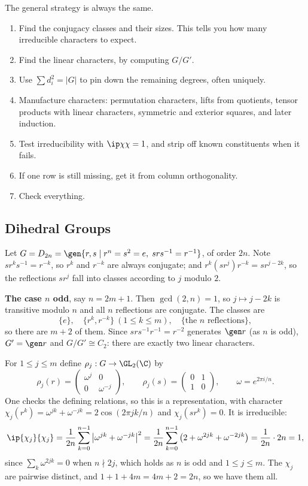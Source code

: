 The general strategy is always the same.
\begin{enumerate}[label=(\arabic*)]
	\item Find the conjugacy classes and their sizes. This tells you how many irreducible characters to expect.
	\item Find the linear characters, by computing $G/G'$.
	\item Use $\sum d_i^2 = |G|$ to pin down the remaining degrees, often uniquely.
	\item Manufacture characters: permutation characters, lifts from quotients, tensor products with linear characters, symmetric and exterior squares, and later induction.
	\item Test irreducibility with $\ip\chi\chi = 1$, and strip off known constituents when it fails.
	\item If one row is still missing, get it from column orthogonality.
	\item Check everything.
\end{enumerate}

\subsection{Dihedral Groups}

Let $G = D_{2n} = \gen{r,s \mid r^n = s^2 = e,\; srs^{-1} = r^{-1}}$, of order $2n$. Note $sr^ks^{-1} = r^{-k}$, so $r^k$ and $r^{-k}$ are always conjugate; and $r^k(sr^j)r^{-k} = sr^{j-2k}$, so the reflections $sr^j$ fall into classes according to $j$ modulo $2$.

\textbf{The case $n$ odd}, say $n = 2m+1$. Then $\gcd(2,n) = 1$, so $j \mapsto j - 2k$ is transitive modulo $n$ and all $n$ reflections are conjugate. The classes are
$$\{e\}, \quad \{r^k, r^{-k}\}\ (1\leq k\leq m), \quad \{\text{the } n \text{ reflections}\},$$
so there are $m + 2$ of them. Since $srs^{-1}r^{-1} = r^{-2}$ generates $\gen r$ (as $n$ is odd), $G' = \gen r$ and $G/G' \cong C_2$: there are exactly two linear characters.

For $1 \leq j\leq m$ define $\rho_j : G \to \GL_2(\C)$ by
$$\rho_j(r) = \begin{pmatrix}\omega^j & 0\\ 0 & \omega^{-j}\end{pmatrix}, \qquad \rho_j(s) = \begin{pmatrix}0&1\\1&0\end{pmatrix}, \qquad \omega = e^{2\pi i/n}.$$
One checks the defining relations, so this is a representation, with character $\chi_j(r^k) = \omega^{jk}+\omega^{-jk} = 2\cos(2\pi jk/n)$ and $\chi_j(sr^k) = 0$. It is irreducible:
$$\ip{\chi_j}{\chi_j} = \frac1{2n}\sum_{k=0}^{n-1}\big|\omega^{jk}+\omega^{-jk}\big|^2 = \frac1{2n}\sum_{k=0}^{n-1}\big(2 + \omega^{2jk}+\omega^{-2jk}\big) = \frac{1}{2n}\cdot 2n = 1,$$
since $\sum_k \omega^{2jk} = 0$ when $n \nmid 2j$, which holds as $n$ is odd and $1\leq j\leq m$. The $\chi_j$ are pairwise distinct, and $1 + 1 + 4m = 4m+2 = 2n$, so we have them all.

